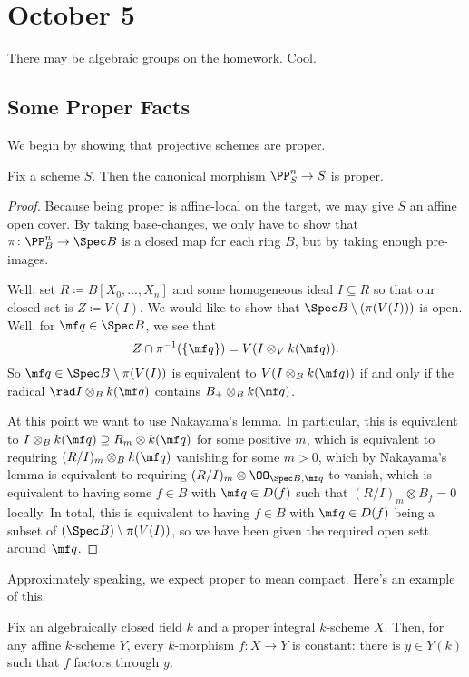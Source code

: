 \documentclass[../notes.tex]{subfiles}
\begin{document}
\section{October 5}

There may be algebraic groups on the homework. Cool.

\subsection{Some Proper Facts}
We begin by showing that projective schemes are proper.
\begin{proposition}
	Fix a scheme $S$. Then the canonical morphism $\PP^n_S\to S$ is proper.
\end{proposition}
\begin{proof}
	Because being proper is affine-local on the target, we may give $S$ an affine open cover. By taking base-changes, we only have to show that $\pi\colon\PP^n_B\to\Spec B$ is a closed map for each ring $B$, but by taking enough pre-images.

	Well, set $R\coloneqq B[X_0,\ldots,X_n]$ and some homogeneous ideal $I\subseteq R$ so that our closed set is $Z\coloneqq V(I)$. We would like to show that $\Spec B\setminus(\pi(V(I)))$ is open. Well, for $\mf q\in\Spec B$, we see that
	\[Z\cap\pi^{-1}(\{\mf q\})=V(I\otimes_Vk(\mf q)).\]
	So $\mf q\in\Spec B\setminus\pi(V(I))$ is equivalent to $V(I\otimes_Bk(\mf q))$ if and only if the radical $\rad I\otimes_Bk(\mf q)$ contains $B_+\otimes_Bk(\mf q)$.
	
	At this point we want to use Nakayama's lemma. In particular, this is equivalent to $I\otimes_Bk(\mf q)\supseteq R_m\otimes k(\mf q)$ for some positive $m$, which is equivalent to requiring $(R/I)_m\otimes_Bk(\mf q)$ vanishing for some $m>0$, which by Nakayama's lemma is equivalent to requiring $(R/I)_m\otimes\OO_{\Spec B,\mf q}$ to vanish, which is equivalent to having some $f\in B$ with $\mf q\in D(f)$ such that $(R/I)_m\otimes B_f=0$ locally. In total, this is equivalent to having $f\in B$ with $\mf q\in D(f)$ being a subset of $(\Spec B)\setminus\pi(V(I))$, so we have been given the required open sett around $\mf q$.
\end{proof}
Approximately speaking, we expect proper to mean compact. Here's an example of this.
\begin{proposition}
	Fix an algebraically closed field $k$ and a proper integral $k$-scheme $X$. Then, for any affine $k$-scheme $Y$, every $k$-morphism $f\colon X\to Y$ is constant: there is $y\in Y(k)$ such that $f$ factors through $y$.
\end{proposition}
\end{document}
